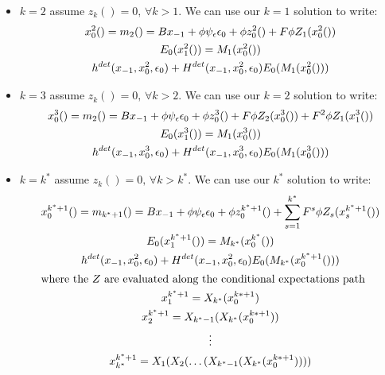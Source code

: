 \documentclass[letter]{beamer}
\begin{document}
\begin{frame}

{\tiny

  \begin{itemize}
  \item $k=2$ assume $z_k()=0, \, \forall k>1$.
We can use our $k=1$ solution to write:
  \begin{gather*}
x_0^2()=m_2()=B x_{-1} +\phi \psi_\epsilon \epsilon_0 + \phi z_0^2()+
 F \phi Z_1(x_0^2())\\
E_0(x_1^2())=M_1(x_0^2()) \\
\nlEqn{x_{-1}}{x_0^2}{M_1(x_0^2())}{0} \\
  \end{gather*}
  \item $k=3$ assume $z_k()=0, \, \forall k>2$.
We can use our $k=2$ solution to write:
  \begin{gather*}
x_0^3()=m_2()=B x_{-1} +\phi \psi_\epsilon \epsilon_0 + \phi z_0^3()+
 F \phi Z_2(x_0^3())+
 F^2 \phi Z_1(x_1^3())\\
E_0(x_1^3())=M_1(x_0^3()) \\
\nlEqn{x_{-1}}{x_0^3}{M_1(x_0^3())}{0} \\
  \end{gather*}
  \end{itemize}
}
\end{frame}



\begin{frame}

{\tiny

  \begin{itemize}
  \item $k=k^\ast$ assume $z_k()=0, \, \forall k>k^\ast$.
We can use our $k^\ast$ solution to write:
  \begin{gather*}
x_0^{k^\ast+1}()=m_{k^\ast+1}()=B x_{-1} +\phi \psi_\epsilon \epsilon_0 + \phi z_0^{k^\ast+1}()+
\sum_{s=1}^{k^\ast}  F^s \phi Z_s(x_s^{k^\ast+1}())\\
E_0(x_1^{k^\ast + 1}())=M_{k^\ast}(x_0^{k^\ast}()) \\
\nlEqn{x_{-1}}{x_0^2}{M_{k^\ast}(x_0^{k^\ast+1}())}{0} \\ \intertext{where the $Z$ are evaluated along the  conditional expectations path}
x_1^{k^\ast+1}=  X_{k^\ast}(x_0^{k\ast+1})\\ x_2^{k^\ast+1}=  X_{k^\ast-1}(X_{k^\ast}(x_0^{k\ast+1}))\\ \vdots \\x_{k^\ast}^{k^\ast+1}= X_{1}(X_{2}(\ldots( X_{k^\ast-1}(X_{k^\ast}(x_0^{k\ast+1}))))
  \end{gather*}
  \end{itemize}
}
\end{frame}
\end{document}
